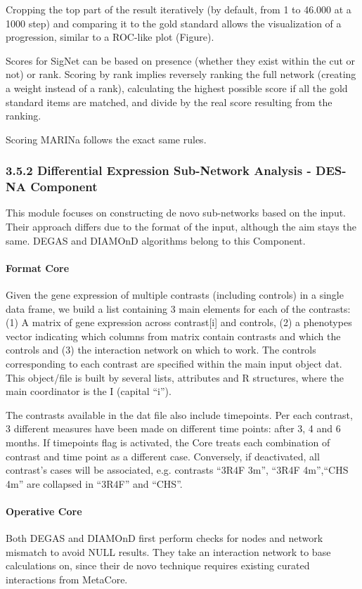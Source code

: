 Cropping the top part of the result iteratively (by default, from 1 to 46.000 at a 1000 step) and comparing it to the gold standard allows the visualization of a progression, similar to a ROC-like plot (Figure).

Scores for SigNet can be based on presence (whether they exist within the cut or not) or rank. Scoring by rank implies reversely ranking the full network (creating a weight instead of a rank), calculating the highest possible score if all the gold standard items are matched, and divide by the real score resulting from the ranking.

Scoring MARINa follows the exact same rules.

\subsubsection{3.5.2 Differential Expression Sub-Network Analysis - DES-NA Component}

This module focuses on constructing de novo sub-networks based on the input. Their approach differs due to the format of the input, although the aim stays the same. DEGAS and DIAMOnD algorithms belong to this Component.

\paragraph{Format Core}
Given the gene expression of multiple contrasts (including controls) in a single data frame, we build a list containing 3 main elements for each of the contrasts: (1) A matrix of gene expression across contrast[i] and controls, (2) a phenotypes vector indicating which columns from matrix contain contrasts and which the controls and (3) the interaction network on which to work.
The controls corresponding to each contrast are specified within the main input object dat. This object/file is built by several lists, attributes and R structures, where the main coordinator is the I (capital “i”).

The contrasts available in the dat file also include timepoints. Per each contrast, 3 different measures have been made on different time points: after 3, 4 and 6 months. If timepoints flag is activated, the Core treats each combination of contrast and time point as a different case. Conversely, if deactivated, all contrast’s cases will be associated, e.g. contrasts “3R4F 3m”, “3R4F 4m”,“CHS 4m” are collapsed in “3R4F” and “CHS”.

\paragraph{Operative Core}
Both DEGAS and DIAMOnD first perform checks for nodes and network mismatch to avoid NULL results. They take an interaction network to base calculations on, since their de novo technique requires existing curated interactions from MetaCore.

